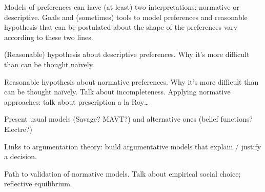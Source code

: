\documentclass[french, english]{llncs}
\begin{document}
\begin{description}
	\item Models of preferences can have (at least) two interpretations: normative or descriptive. Goals and (sometimes) tools to model preferences and reasonable hypothesis that can be postulated about the shape of the preferences vary according to these two lines.
	\item (Reasonable) hypothesis about descriptive preferences. Why it’s more difficult than can be thought naïvely. 
	\item Reasonable hypothesis about normative preferences. Why it’s more difficult than can be thought naïvely. Talk about incompleteness. Applying normative approaches: talk about prescription a la Roy…
	\item Present usual models (Savage? MAVT?) and alternative ones (belief functions? Electre?)
	\item Links to argumentation theory: build argumentative models that explain / justify a decision.
	\item Path to validation of normative models. Talk about empirical social choice; reflective equilibrium.
\end{description}
\end{document}
